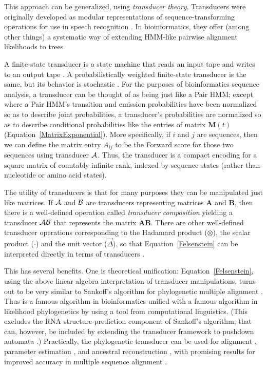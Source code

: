 \documentclass{bmcart}
\newcommand{\matr}[1]{\mathbf{#1}}
\newcommand{\trans}[1]{{\cal #1}}
\newcommand{\eqref}[1]{Equation~\ref{#1}}
\newcommand{\condmatrix}{\matr{M}}
\newcommand{\unitvec}{\vec{\Delta}}
\newcommand{\pointprod}{\otimes}
\newcommand{\scalarprod}{\cdot}
\begin{document}
This approach can be generalized, using {\em transducer theory}.
Transducers were originally developed as modular representations of sequence-transforming operations
for use in speech recognition \cite{MohriPereiraRiley2000}.
In bioinformatics, they offer (among other things)
a systematic way of extending HMM-like pairwise alignment likelihoods to trees
\cite{WestessonEtAl2012,BouchardCote2013,IndelHistorian}

A finite-state transducer is a state machine that reads an input tape and writes to an output tape \cite{Mealy55}.
A probabilistically weighted finite-state transducer is the same, but its behavior is stochastic \cite{MohriPereiraRiley2000}.
For the purposes of bioinformatics sequence analysis,
a transducer can be thought of as being just like a Pair HMM;
except where a Pair HMM's transition and emission probabilities
have been normalized so as to describe joint probabilities,
a transducer's probabilities are normalized so as to describe conditional probabilities
like the entries of matrix $\condmatrix(t)$ (\eqref{MatrixExponential}).
More specifically, if $i$ and $j$ are sequences, then we can define the matrix entry $A_{ij}$
to be the Forward score for those two sequences using transducer $\trans{A}$.
Thus, the transducer is a compact encoding for a square matrix of countably infinite rank,
indexed by sequence states (rather than nucleotide or amino acid states).

The utility of transducers is that for many purposes they can be manipulated just like matrices.
If $\trans{A}$ and $\trans{B}$ are transducers representing matrices $\matr{A}$ and $\matr{B}$,
then there is a well-defined operation called {\em transducer composition}
yielding a transducer $\trans{A}\trans{B}$ that represents the matrix $\matr{A}\matr{B}$.
There are other well-defined transducer operations corresponding to the Hadamard product
($\pointprod$), the scalar product ($\scalarprod$) and the unit vector ($\unitvec$),
so that \eqref{Felsenstein} can be interpreted directly
in terms of transducers \cite{WestessonEtAlArxiv2011,WestessonEtAl2012,BouchardCote2013}.

This has several benefits.
One is theoretical unification: \eqref{Felsenstein}, using the above
linear algebra interpretation of transducer manipulations,
turns out to be very similar to Sankoff's algorithm for phylogenetic multiple alignment \cite{Sankoff85}.
Thus is a famous algorithm in bioinformatics unified with a famous algorithm in likelihood phylogenetics
by using a tool from computational linguistics.
(This excludes the RNA structure-prediction component of Sankoff's algorithm;
that can, however, be included by extending the transducer
framework to pushdown automata \cite{BradleyHolmes2009}.)
Practically, the phylogenetic transducer can be used for alignment \cite{RedelingsSuchard2005,RedelingsSuchard2007},
parameter estimation \cite{Redelings2014}, and ancestral reconstruction \cite{WestessonEtAl2012},
with promising results for improved accuracy in multiple sequence alignment \cite{IndelHistorian}.
\end{document}
